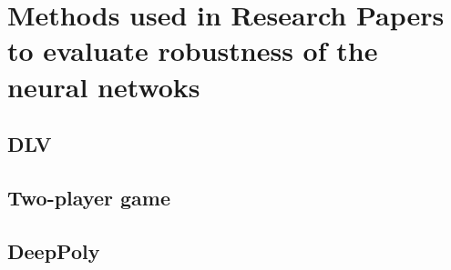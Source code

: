 
\section{Methods used in Research Papers to evaluate robustness of the neural netwoks}
\subsection {DLV}
\subsection {Two-player game}
\subsection {DeepPoly}

